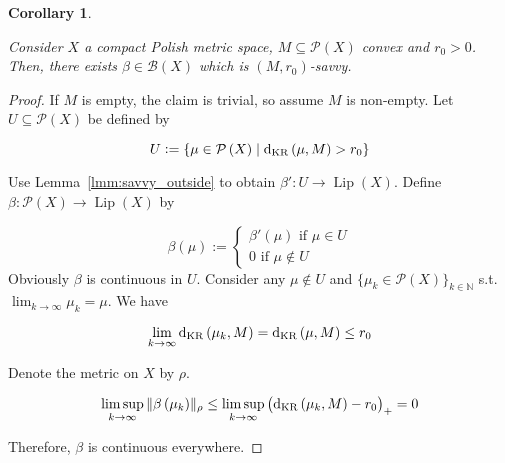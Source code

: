 \documentclass[aop,preprint]{imsart}
\numberwithin{equation}{section}
\theoremstyle{definition}
\theoremstyle{plain}
\newtheorem{corollary}{Corollary}[section]
\newcommand{\Nats}{\mathbb{N}}
\newcommand{\N}[1]{\lVert #1 \rVert}
\newcommand{\Sq}[2]{\{#1\}_{#2 \in \Nats}}
\newcommand{\PM}{\mathcal{P}}
\newcommand{\Lp}{{\operatorname{Lip}}}
\newcommand{\DKR}{\operatorname{d}_{\textnormal{KR}}}
\newcommand{\Gm}{\mathcal{B}}
\begin{document}
\begin{samepage}
\begin{corollary}
\label{crl:savvy}

Consider $X$ a compact Polish metric space, $M \subseteq \PM\left(X\right)$ convex and $r_0 > 0$. Then, there exists $\beta \in \Gm\left(X\right)$ which is $\left(M,r_0\right)$-savvy.

\end{corollary}
\end{samepage}

\begin{proof}

If $M$ is empty, the claim is trivial, so assume $M$ is non-empty. Let $U \subseteq \PM\left(X\right)$ be defined by

$$U:=\{\mu \in \PM\left(X\right) \mid \DKR\left(\mu, M\right) > r_0\}$$

Use Lemma~\ref{lmm:savvy_outside} to obtain $\beta': U \rightarrow \Lp\left(X\right)$. Define $\beta: \PM\left(X\right) \rightarrow \Lp\left(X\right)$ by

$$\beta\left(\mu\right):=\begin{cases}\beta'\left(\mu\right) \text{ if } \mu \in U\\0 \text { if } \mu \not\in U\end{cases}$$ 
Obviously $\beta$ is continuous in $U$. Consider any $\mu \not\in U$ and $\Sq{\mu_k \in \PM\left(X\right)}{k}$ s.t. $\lim_{k \rightarrow \infty} \mu_k = \mu$. We have 

$$\lim_{k \rightarrow \infty} \DKR\left(\mu_k,M\right) = \DKR\left(\mu, M\right) \leq r_0$$

Denote the metric on $X$ by $\rho$. 

$$\limsup_{k \rightarrow \infty}{\N{\beta\left(\mu_k\right)}_\rho} \leq \limsup_{k \rightarrow \infty}{\left(\DKR\left(\mu_k,M\right) - r_0\right)_+} = 0$$

Therefore, $\beta$ is continuous everywhere.
\end{proof}
\end{document}
